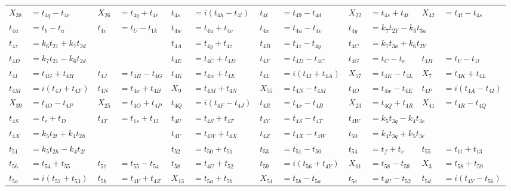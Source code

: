 \begin{tabular}{|p{4.3pt}l|p{4.3pt}l|p{4.3pt}l|p{4.3pt}l|p{4.3pt}l|p{4.3pt}l|}
$X_{38} $ &$= t_{4q} - t_{4r}$ & $X_{26} $ &$= t_{4q} + t_{4r}$ & $t_{4s} $ &$= i(t_{4h} - t_{4l})$ & $t_{4t} $ &$= t_{49} - t_{4d}$ & $X_{22} $ &$= t_{4s} + t_{4t}$ & $X_{42} $ &$= t_{4t} - t_{4s}$\\ 
$t_{4u} $ &$= t_b - t_u$ & $t_{4v} $ &$= t_U - t_{1k}$ & $t_{4w} $ &$= t_{4u} + t_{4v}$ & $t_{4x} $ &$= t_{4u} - t_{4v}$ & $t_{4y} $ &\multicolumn{3}{l|}{$= k_7t_{2Y} - k_6t_{3a}$}\\ 
$t_{4z} $ &\multicolumn{3}{l|}{$= k_6t_{21} + k_7t_{2d}$} & $t_{4A} $ &$= t_{4y} + t_{4z}$ & $t_{4B} $ &$= t_{4z} - t_{4y}$ & $t_{4C} $ &\multicolumn{3}{l|}{$= k_7t_{3a} + k_6t_{2Y}$}\\ 
$t_{4D} $ &\multicolumn{3}{l|}{$= k_7t_{21} - k_6t_{2d}$} & $t_{4E} $ &$= t_{4C} + t_{4D}$ & $t_{4F} $ &$= t_{4D} - t_{4C}$ & $t_{4G} $ &$= t_C - t_e$ & $t_{4H} $ &$= t_V - t_{1l}$\\ 
$t_{4I} $ &$= t_{4G} + t_{4H}$ & $t_{4J} $ &$= t_{4H} - t_{4G}$ & $t_{4K} $ &$= t_{4w} + t_{4E}$ & $t_{4L} $ &$= i(t_{4I} + t_{4A})$ & $X_{57} $ &$= t_{4K} - t_{4L}$ & $X_7 $ &$= t_{4K} + t_{4L}$\\ 
$t_{4M} $ &$= i(t_{4J} + t_{4F})$ & $t_{4N} $ &$= t_{4x} + t_{4B}$ & $X_9 $ &$= t_{4M} + t_{4N}$ & $X_{55} $ &$= t_{4N} - t_{4M}$ & $t_{4O} $ &$= t_{4w} - t_{4E}$ & $t_{4P} $ &$= i(t_{4A} - t_{4I})$\\ 
$X_{39} $ &$= t_{4O} - t_{4P}$ & $X_{25} $ &$= t_{4O} + t_{4P}$ & $t_{4Q} $ &$= i(t_{4F} - t_{4J})$ & $t_{4R} $ &$= t_{4x} - t_{4B}$ & $X_{23} $ &$= t_{4Q} + t_{4R}$ & $X_{41} $ &$= t_{4R} - t_{4Q}$\\ 
$t_{4S} $ &$= t_c + t_D$ & $t_{4T} $ &$= t_{1s} + t_{12}$ & $t_{4U} $ &$= t_{4S} + t_{4T}$ & $t_{4V} $ &$= t_{4S} - t_{4T}$ & $t_{4W} $ &\multicolumn{3}{l|}{$= k_5t_{3q} - k_4t_{3e}$}\\ 
$t_{4X} $ &\multicolumn{3}{l|}{$= k_5t_{2t} + k_4t_{2h}$} & $t_{4Y} $ &$= t_{4W} + t_{4X}$ & $t_{4Z} $ &$= t_{4X} - t_{4W}$ & $t_{50} $ &\multicolumn{3}{l|}{$= k_4t_{3q} + k_5t_{3e}$}\\ 
$t_{51} $ &\multicolumn{3}{l|}{$= k_5t_{2h} - k_4t_{2t}$} & $t_{52} $ &$= t_{50} + t_{51}$ & $t_{53} $ &$= t_{51} - t_{50}$ & $t_{54} $ &$= t_f + t_v$ & $t_{55} $ &$= t_{1t} + t_{13}$\\ 
$t_{56} $ &$= t_{54} + t_{55}$ & $t_{57} $ &$= t_{55} - t_{54}$ & $t_{58} $ &$= t_{4U} + t_{52}$ & $t_{59} $ &$= i(t_{56} + t_{4Y})$ & $X_{61} $ &$= t_{58} - t_{59}$ & $X_3 $ &$= t_{58} + t_{59}$\\ 
$t_{5a} $ &$= i(t_{57} + t_{53})$ & $t_{5b} $ &$= t_{4V} + t_{4Z}$ & $X_{13} $ &$= t_{5a} + t_{5b}$ & $X_{51} $ &$= t_{5b} - t_{5a}$ & $t_{5c} $ &$= t_{4U} - t_{52}$ & $t_{5d} $ &$= i(t_{4Y} - t_{56})$\\ 

\end{tabular}
